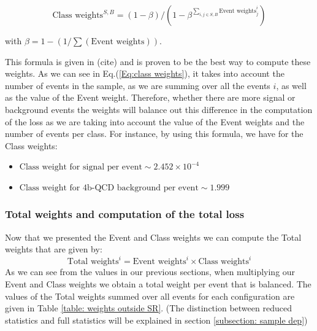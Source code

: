 \begin{equation}
    \text{Class weights}^{S,B} = (1- \beta)/ (1- \beta^{\sum_{i,j\in S,B}\text{Event weights}^i_j})
    \label{Eq:class weights}
\end{equation}

\noindent with $\beta= 1 - (1/\sum (\text{Event weights}))$.

\vspace{0.1cm}

This formula is given in (cite) and is proven to be the best way to compute these weights. As we can see in Eq.(\ref{Eq:class weights}), it takes into account the number of events in the sample, as we are summing over all the events $i$, as well as the value of the Event weight. Therefore, whether there are more signal or background events the weights will balance out this difference in the computation of the loss as we are taking into account the value of the Event weights and the number of events per class. For instance, by using this formula, we have for the Class weights:
\begin{itemize}
    \item $\text{Class weight for signal per event} \sim 2.452 \times 10^{-4}$
    \item $\text{Class weight for 4b-QCD background per event} \sim 1.999$
\end{itemize}


\subsubsection{Total weights and computation of the total loss}

\noindent Now that we presented the Event and Class weights we can compute the Total weights that are given by:
\begin{equation*}
    \text{Total weights}^i = \text{Event weights}^i \times \text{Class weights}^i
\end{equation*}
As we can see from the values in our previous sections, when multiplying our Event and Class weights we obtain a total weight per event that is balanced. The values of the Total weights summed over all events for each configuration are given in Table \ref{table: weights outside SR}.  (The distinction between reduced statistics and full statistics will be explained in section \ref{subsection: sample dep})

